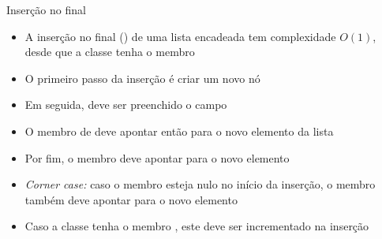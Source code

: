 \begin{frame}[fragile]{Inserção no final}

    \begin{itemize}
        \item A inserção no final () de uma lista encadeada tem
            complexidade $O(1)$, desde que a classe tenha o membro 

        \item O primeiro passo da inserção é criar um novo nó

        \item Em seguida, deve ser preenchido o campo 

        \item O membro  de  deve apontar então para 
        o novo elemento da lista

        \item Por fim, o membro  deve apontar para o novo elemento

        \item \textit{Corner case:} caso o membro  esteja nulo no início da 
            inserção, o membro  também deve apontar para o novo elemento

        \item Caso a classe tenha o membro , este deve ser incrementado
            na inserção
    \end{itemize}

\end{frame}

